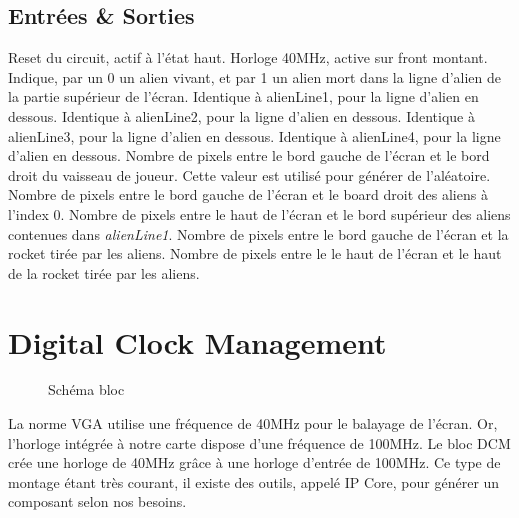 \documentclass[french]{nakrule}
\begin{document}
\clearpage

\subsection{Entrées \& Sorties}
\label{subsec:Entrées_Sorties_alienRocket}

\begin{descr}
   Reset du circuit, actif à l'état haut.
   Horloge 40MHz, active sur front montant.
   Indique, par un 0 un alien vivant, et par 1 un alien
  mort dans la ligne d'alien de la partie supérieur de l'écran.
   Identique à alienLine1, pour la ligne d'alien en dessous.
   Identique à alienLine2, pour la ligne d'alien en dessous.
   Identique à alienLine3, pour la ligne d'alien en dessous.
   Identique à alienLine4, pour la ligne d'alien en dessous.
   Nombre de pixels entre le bord gauche de l'écran et
  le bord droit du vaisseau de joueur. Cette valeur est utilisé pour générer de l'aléatoire.
   Nombre de pixels entre le bord gauche de l'écran et le
  board droit des aliens à l'index 0.
   Nombre de pixels entre le haut de l'écran et le bord
  supérieur des aliens contenues dans \emph{alienLine1}.
   Nombre de pixels entre le bord gauche de l'écran et
  la rocket tirée par les aliens.
   Nombre de pixels entre le le haut de l'écran et le
  haut de la rocket tirée par les aliens.
\end{descr}

\clearpage

\section{Digital Clock Management}
\label{sec:dcm}

\begin{figure}
\caption{Schéma bloc}
\label{dcmBloc}
\end{figure}

La norme VGA utilise une fréquence de 40MHz pour le balayage de l’écran. Or,
l’horloge intégrée à notre carte dispose d’une fréquence de 100MHz. Le bloc DCM
crée une horloge de 40MHz grâce à une horloge d'entrée de 100MHz.
Ce type de montage étant très courant, il existe des outils, appelé IP Core, pour générer un
composant selon nos besoins.
\end{document}
